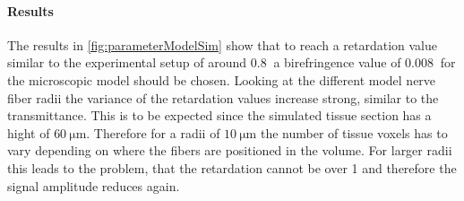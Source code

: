 \paragraph{Results}
The results in \cref{fig:parameterModelSim} show that to reach a retardation value similar to the experimental setup of around $\SI{0.8}{}$ a birefringence value of $\SI{0.008}{}$ for the microscopic model should be chosen.
Looking at the different model nerve fiber radii the variance of the retardation values increase strong, similar to the transmittance.
This is to be expected since the simulated tissue section has a hight of $\SI{60}{\micro\meter}$.
Therefore for a radii of $\SI{10}{\micro\meter}$ the number of tissue voxels has to vary depending on where the fibers are positioned in the volume.
For larger radii this leads to the problem, that the retardation cannot be over 1 and therefore the signal amplitude reduces again.
% 
% 
% 
% 
% 
